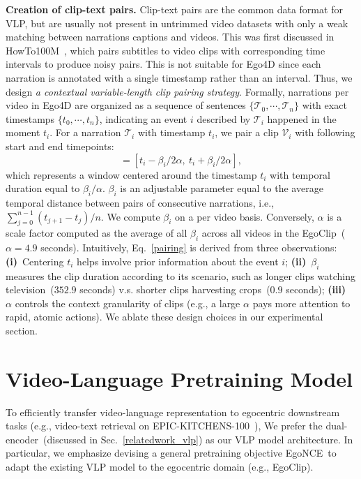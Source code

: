 \documentclass{article}
\newcommand{\dataset}{EgoClip}
\newcommand{\model}{EgoNCE\xspace}
\newcommand{\epic}{EPIC-KITCHENS-100}
\newcommand{\howto}{HowTo100M}
\begin{document}
\textbf{Creation of clip-text pairs.}
Clip-text pairs are the common data format for VLP, but are usually not present in untrimmed video datasets with only a weak matching between narrations captions and videos.
This was first discussed in \howto~\cite{miech2019howto100m}, which pairs subtitles to video clips with corresponding time intervals to produce noisy pairs.
This is not suitable for Ego4D since each narration is annotated with a single timestamp rather than an interval.
Thus, we design \textit{a contextual variable-length clip pairing strategy}.
Formally, narrations per video in Ego4D are organized as a sequence of sentences $\{\mathcal{T}_0, \cdots, \mathcal{T}_n\}$ with exact timestamps $\{t_0, \cdots, t_n\}$, indicating an event $i$ described by $\mathcal{T}_i$ happened in the moment $t_i$.
For a narration $\mathcal{T}_i$ with timestamp $t_i$, we pair a clip $\mathcal{V}_i$ with following start and end timepoints: 
\begin{equation}
	[t_i^{start}, t_i^{end}]=[t_i-\beta_i/2\alpha,~t_i+ \beta_i/2\alpha],
\label{pairing}
\end{equation}
which represents a window centered around the timestamp $t_i$ with temporal duration equal to $\beta_i/\alpha$. $\beta_i$ is an adjustable parameter equal to the average temporal distance between pairs of consecutive narrations, i.e., ${\sum_{j=0}^{n-1}(t_{j+1}-t_j)}/{n}$. We compute $\beta_i$ on a per video basis. Conversely, $\alpha$ is a scale factor computed as the average of all $\beta_i$ across all videos in  the \dataset~($\alpha=4.9$ seconds).
Intuitively, Eq.~\ref{pairing} is derived from three observations:
\textbf{(i)}~Centering $t_i$ helps involve prior information about the event $i$;
\textbf{(ii)}~$\beta_i$ measures the clip duration according to its scenario, such as longer clips watching television~($352.9$ seconds) {v.s.} shorter clips harvesting crops~($0.9$ seconds);
\textbf{(iii)}~$\alpha$ controls the context granularity of clips (e.g.,
a large $\alpha$ pays more attention to rapid, atomic actions).
We ablate these design choices in our experimental section. \section{Video-Language Pretraining Model}
To efficiently transfer video-language representation to egocentric downstream tasks (e.g., video-text retrieval on \epic~\cite{damen2022rescaling}), We prefer the dual-encoder~(discussed in Sec.~\ref{relatedwork_vlp}) as our VLP model architecture.
In particular, we emphasize devising a general pretraining objective \model~to adapt the existing VLP model to the egocentric domain (e.g., \dataset).
\end{document}
